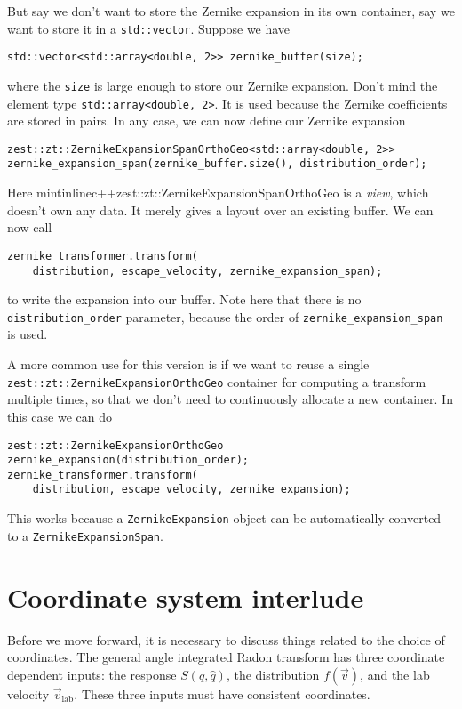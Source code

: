\documentclass{article}
\newcommand{\unitv}[1]{\hat{#1}}
\begin{document}
But say we don't want to store the Zernike expansion in its own container, say we want to store it in a \texttt{std::vector}. Suppose we have 
\begin{verbatim}
std::vector<std::array<double, 2>> zernike_buffer(size);
\end{verbatim}
where the \texttt{size} is large enough to store our Zernike expansion. Don't mind the element type \texttt{std::array<double, 2>}. It is used because the Zernike coefficients are stored in pairs. In any case, we can now define our Zernike expansion
\begin{verbatim}
zest::zt::ZernikeExpansionSpanOrthoGeo<std::array<double, 2>>
zernike_expansion_span(zernike_buffer.size(), distribution_order);
\end{verbatim}
Here mintinline{c++}{zest::zt::ZernikeExpansionSpanOrthoGeo} is a \emph{view}, which doesn't own any data. It merely gives a layout over an existing buffer. We can now call
\begin{verbatim}
zernike_transformer.transform(
    distribution, escape_velocity, zernike_expansion_span);
\end{verbatim}
to write the expansion into our buffer. Note here that there is no \texttt{distribution_order} parameter, because the order of \texttt{zernike_expansion_span} is used.

A more common use for this version is if we want to reuse a single \texttt{zest::zt::ZernikeExpansionOrthoGeo} container for computing a transform multiple times, so that we don't need to continuously allocate a new container. In this case we can do
\begin{verbatim}
zest::zt::ZernikeExpansionOrthoGeo zernike_expansion(distribution_order);
zernike_transformer.transform(
    distribution, escape_velocity, zernike_expansion);
\end{verbatim}
This works because a \texttt{ZernikeExpansion} object can be automatically converted to a \texttt{ZernikeExpansionSpan}.

\section{Coordinate system interlude}

Before we move forward, it is necessary to discuss things related to the choice of coordinates. The general angle integrated Radon transform has three coordinate dependent inputs: the response $S(q,\unitv{q})$, the distribution $f(\vec{v})$, and the lab velocity $\vec{v}_\text{lab}$. These three inputs must have consistent coordinates.
\end{document}
